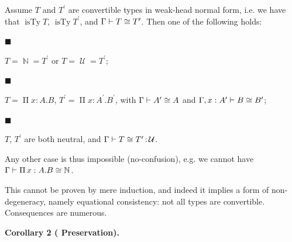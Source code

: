  
Assume $T$ and $T^{\prime}$ are convertible types in weak-head normal form, i.e. we have that $\operatorname{isTy}T$, $\operatorname{isTy}T^{\prime}$, and $\Gamma\vdash T\mathrel{\raisebox{-0.5pt}{$\cong$}}T^{\prime}$. Then one of the following holds:\par
  
\par\noindent  $\blacksquare$ 
 
$T=\operatorname{\mathbb{N}}=T^{\prime}$ or $T=\operatorname{\mathcal{U}}=T^{\prime}$;\par
 
 
 
\par\noindent  $\blacksquare$ 
 
$T=\operatorname{\Pi}x:A.B$, $T^{\prime}=\operatorname{\Pi}x:A^{\prime}.B^{\prime}$, with $\Gamma\vdash A^{\prime}\mathrel{\raisebox{-0.5pt}{$\cong$}}A$ and $\Gamma,x:A^{\prime}\vdash B\mathrel{\raisebox{-0.5pt}{$\cong$}}B^{\prime}$;\par
 
 
 
\par\noindent  $\blacksquare$ 
 
$T$, $T^{\prime}$ are both neutral, and $\Gamma\vdash T\mathrel{\raisebox{-0.5pt}{$\cong$}}T^{\prime}\operatorname{%
\mathrel{:}}\operatorname{\mathcal{U}}$.\par
 
 
  
Any other case is thus impossible (no-confusion), e.g. we cannot have $\Gamma\vdash\operatorname{\Pi}x:A.B\mathrel{\raisebox{-0.5pt}{$\cong$}}%
\operatorname{\mathbb{N}}$.\par
 
 
 
 
This cannot be proven by mere induction, and indeed it implies a form of non-degeneracy, namely equational consistency: not all types are convertible. Consequences are numerous.\par
 
 
 
\par\medskip\noindent\textbf{Corollary 2 (  Preservation).}\par
 
